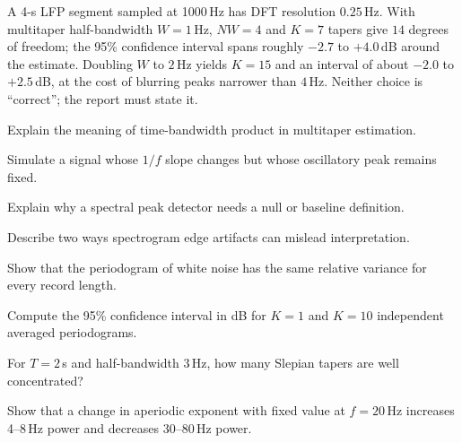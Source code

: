 \begin{workedexample}
A 4-s LFP segment sampled at 1000\,Hz has DFT resolution $0.25$\,Hz. With multitaper half-bandwidth $W=1$\,Hz, $NW=4$ and $K=7$ tapers give $14$ degrees of freedom; the 95\% confidence interval spans roughly $-2.7$ to $+4.0$\,dB around the estimate. Doubling $W$ to $2$\,Hz yields $K=15$ and an interval of about $-2.0$ to $+2.5$\,dB, at the cost of blurring peaks narrower than $4$\,Hz. Neither choice is ``correct''; the report must state it.
\end{workedexample}
\begin{exercises}
\item Explain the meaning of time-bandwidth product in multitaper estimation.
\item Simulate a signal whose $1/f$ slope changes but whose oscillatory peak remains fixed.
\item Explain why a spectral peak detector needs a null or baseline definition.
\item Describe two ways spectrogram edge artifacts can mislead interpretation.
\item Show that the periodogram of white noise has the same relative variance for every record length.
\item Compute the 95\% confidence interval in dB for $K=1$ and $K=10$ independent averaged periodograms.
\item For $T=2$\,s and half-bandwidth $3$\,Hz, how many Slepian tapers are well concentrated?
\item Show that a change in aperiodic exponent with fixed value at $f=20$\,Hz increases 4--8\,Hz power and decreases 30--80\,Hz power.
\end{exercises}
